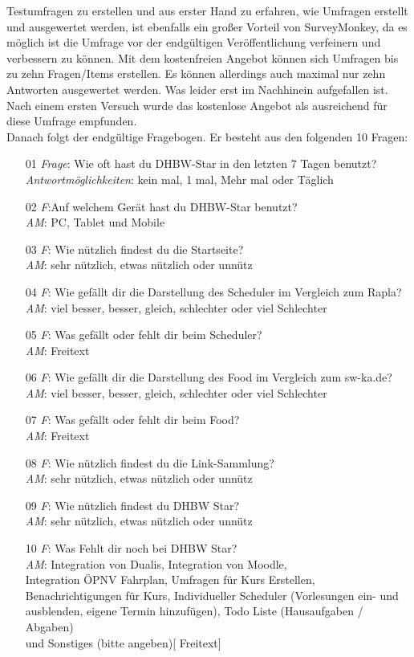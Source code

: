 Testumfragen zu erstellen und aus erster Hand zu erfahren, wie Umfragen erstellt und ausgewertet werden, ist ebenfalls ein großer Vorteil von SurveyMonkey, da es möglich ist die Umfrage vor der endgültigen Veröffentlichung verfeinern und verbessern zu können. 
Mit dem kostenfreien Angebot können sich Umfragen bis zu zehn Fragen/Items erstellen. Es können allerdings auch maximal nur zehn Antworten ausgewertet werden. Was leider erst im Nachhinein aufgefallen ist.\\
Nach einem ersten Versuch wurde das kostenlose Angebot als ausreichend für diese Umfrage empfunden.
\\
Danach folgt der endgültige Fragebogen. Er besteht aus den folgenden 10 Fragen:
\begin{itemize}
	\item[01] {\emph{Frage}: Wie oft hast du DHBW-Star in den letzten 7 Tagen benutzt?\\
		\emph{Antwortmöglichkeiten}: kein mal, 1 mal, Mehr mal oder Täglich}
	\item[02]{\emph{F}:Auf welchem Gerät hast du DHBW-Star benutzt?\\
		\emph{AM}: PC, Tablet und Mobile}
	\item[03]{\emph{F}: Wie nützlich findest du die Startseite?\\
		\emph{AM}: sehr nützlich, etwas nützlich oder unnütz}
	\item[04]{\emph{F}: Wie gefällt dir die Darstellung des Scheduler im Vergleich zum Rapla?\\
		\emph{AM}: viel besser, besser, gleich, schlechter oder viel Schlechter}
	\item[05]{\emph{F}: Was gefällt oder fehlt dir beim Scheduler?\\
		\emph{AM}: Freitext}
	\item[06]{\emph{F}: Wie gefällt dir die Darstellung des Food im Vergleich zum sw-ka.de?\\
		\emph{AM}: viel besser, besser, gleich, schlechter oder viel Schlechter}
	\item[07]{\emph{F}: Was gefällt oder fehlt dir beim Food?\\
		\emph{AM}: Freitext}
	\item[08]{\emph{F}: Wie nützlich findest du die Link-Sammlung?\\
		\emph{AM}: sehr nützlich, etwas nützlich oder unnütz}
	\item[09]{\emph{F}: Wie nützlich findest du DHBW Star?\\
		\emph{AM}: sehr nützlich, etwas nützlich oder unnütz}
	\item[10]{\emph{F}: Was Fehlt dir noch bei DHBW Star?\\
		\emph{AM}: Integration von Dualis, Integration von Moodle,\\ Integration ÖPNV Fahrplan, Umfragen für Kurs Erstellen,\\ Benachrichtigungen für Kurs, Individueller Scheduler (Vorlesungen ein- und ausblenden, eigene Termin hinzufügen), Todo Liste (Hausaufgaben / Abgaben)\\ und Sonstiges (bitte angeben)[ Freitext]}
\end{itemize}
